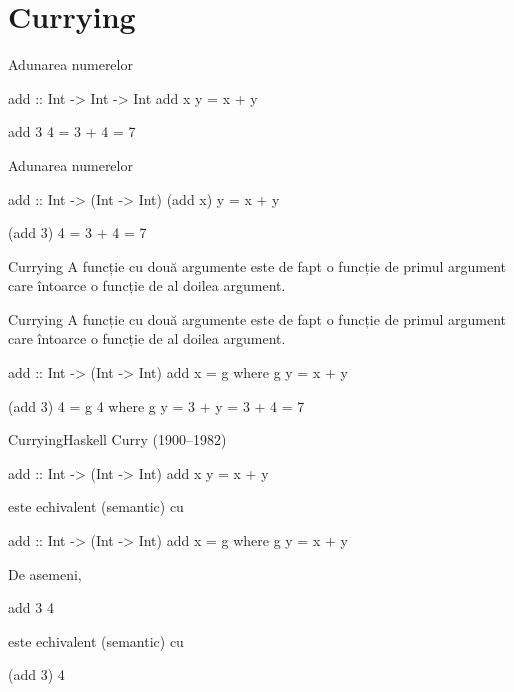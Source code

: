 \documentclass[xcolor=pdftex,romanian,colorlinks]{beamer}
\begin{document}
\section{Currying}

\begin{frame}[fragile]{Adunarea numerelor}
\begin{asciihs}
add :: Int -> Int -> Int
add x y = x + y


  add 3 4
=
  3 + 4
=
  7
\end{asciihs}

\end{frame}

\begin{frame}[fragile]{Adunarea numerelor}
\begin{asciihs}
add :: Int -> (Int -> Int)
(add x) y = x + y


  (add 3) 4
=
  3 + 4
=
  7
\end{asciihs}

\begin{block}{Currying}
A funcție cu două argumente este de fapt o funcție de primul argument
care întoarce o funcție de al doilea argument.
\end{block}
\end{frame}

\begin{frame}[fragile]{Currying}
A funcție cu două argumente este de fapt o funcție de primul argument
care întoarce o funcție de al doilea argument.
\begin{asciihs}
add :: Int -> (Int -> Int)
add x = g
  where
  g y = x + y

  (add 3) 4
=
  g 4
    where
    g y = 3 + y
=
  3 + 4
=
  7
\end{asciihs}
\end{frame}



\begin{frame}[fragile]{Currying}{Haskell Curry (1900--1982)}
\begin{asciihs}
add :: Int -> (Int -> Int)
add x y = x + y
\end{asciihs}
este echivalent (semantic) cu 
\begin{asciihs}
add :: Int -> (Int -> Int)
add x = g
  where
  g y = x + y
\end{asciihs}

\vfill
De asemeni,
\begin{asciihs}
  add 3 4
\end{asciihs}
este echivalent (semantic) cu 
\begin{asciihs}
  (add 3) 4
\end{asciihs}
\end{frame}
\end{document}
